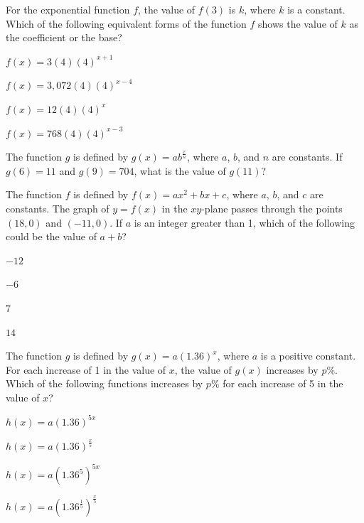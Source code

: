 \vfill
\noindent\begin{minipage}{\linewidth}
\par\smallskip
For the exponential function $f$, the value of $f(3)$ is $k$, where $k$ is a constant. Which of the following equivalent forms of the function $f$ shows the value of $k$ as the coefficient or the base?
\begin{satchoices}
  \item[A)] $f(x)=3(4)(4)^{x+1}$
  \item[B)] $f(x)=3{,}072(4)(4)^{x-4}$
  \item[C)] $f(x)=12(4)(4)^x$
  \item[D)] $f(x)=768(4)(4)^{x-3}$
\end{satchoices}
\end{minipage}
\vfill
\clearpage
\noindent\begin{minipage}{\linewidth}
\par\smallskip
The function $g$ is defined by $g(x)=ab^{\frac{x}{n}}$, where $a$, $b$, and $n$ are constants. If $g(6)=11$ and $g(9)=704$, what is the value of $g(11)$?
\end{minipage}
\vfill
\noindent\begin{minipage}{\linewidth}
\par\smallskip
The function $f$ is defined by $f(x)=ax^2+bx+c$, where $a$, $b$, and $c$ are constants. The graph of $y=f(x)$ in the $xy$-plane passes through the points $(18,0)$ and $(-11,0)$. If $a$ is an integer greater than 1, which of the following could be the value of $a+b$?
\begin{satchoices}
  \item[A)] $-12$
  \item[B)] $-6$
  \item[C)] $7$
  \item[D)] $14$
\end{satchoices}
\end{minipage}
\vfill
\noindent\begin{minipage}{\linewidth}
\par\smallskip
The function $g$ is defined by $g(x)=a(1.36)^x$, where $a$ is a positive constant. For each increase of 1 in the value of $x$, the value of $g(x)$ increases by $p\%$. Which of the following functions increases by $p\%$ for each increase of 5 in the value of $x$?
\begin{satchoices}
  \item[A)] $h(x)=a(1.36)^{5x}$
  \item[B)] $h(x)=a(1.36)^{\frac{x}{5}}$
  \item[C)] $h(x)=a(1.36^5)^{5x}$
  \item[D)] $h(x)=a\left(1.36^{\frac{1}{5}}\right)^{\frac{x}{5}}$
\end{satchoices}
\end{minipage}
